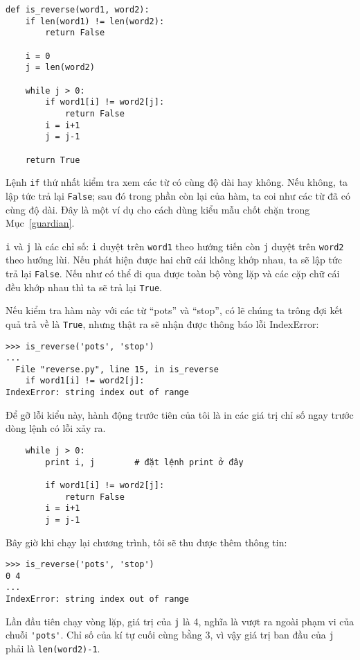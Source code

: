 \documentclass[11pt]{book}
\begin{document}
\beforeverb
\begin{verbatim}
def is_reverse(word1, word2):
    if len(word1) != len(word2):
        return False
    
    i = 0
    j = len(word2)

    while j > 0:
        if word1[i] != word2[j]:
            return False
        i = i+1
        j = j-1

    return True
\end{verbatim}
\afterverb
%
Lệnh {\tt if} thứ nhất kiểm tra xem các từ có cùng độ dài hay không.
Nếu không, ta lập tức trả lại {\tt False}; sau đó trong phần còn lại 
của hàm, ta coi như các từ đã có cùng độ dài. Đây là một ví dụ cho
cách dùng kiểu mẫu chốt chặn trong Mục~\ref{guardian}.


{\tt i} và {\tt j} là các chỉ số: {\tt i} duyệt trên {\tt word1} theo hướng
tiến còn {\tt j} duyệt trên {\tt word2} theo hướng lùi. Nếu phát hiện
được hai chữ cái không khớp nhau, ta sẽ lập tức trả lại {\tt False}. 
Nếu như có thể đi qua được toàn bộ vòng lặp và các cặp chữ cái
đều khớp nhau thì ta sẽ trả lại {\tt True}.

Nếu kiểm tra hàm này với các từ ``pots'' và ``stop'', có lẽ chúng ta
trông đợi kết quả trả về là {\tt True}, nhưng thật ra sẽ nhận được 
thông báo lỗi IndexError:


\beforeverb
\begin{verbatim}
>>> is_reverse('pots', 'stop')
...
  File "reverse.py", line 15, in is_reverse
    if word1[i] != word2[j]:
IndexError: string index out of range
\end{verbatim}
\afterverb
%
Để gỡ lỗi kiểu này, hành động trước tiên của tôi là in các giá trị
chỉ số ngay trước dòng lệnh có lỗi xảy ra.

\beforeverb
\begin{verbatim}
    while j > 0:
        print i, j        # đặt lệnh print ở đây
        
        if word1[i] != word2[j]:
            return False
        i = i+1
        j = j-1
\end{verbatim}
\afterverb
%
Bây giờ khi chạy lại chương trình, tôi sẽ thu được thêm thông tin:

\beforeverb
\begin{verbatim}
>>> is_reverse('pots', 'stop')
0 4
...
IndexError: string index out of range
\end{verbatim}
\afterverb
%
Lần đầu tiên chạy vòng lặp, giá trị của {\tt j} là 4,
nghĩa là vượt ra ngoài phạm vi của chuỗi \verb"'pots'".
Chỉ số của kí tự cuối cùng bằng 3, vì vậy giá trị 
ban đầu của {\tt j} phải là {\tt len(word2)-1}.
\end{document}
